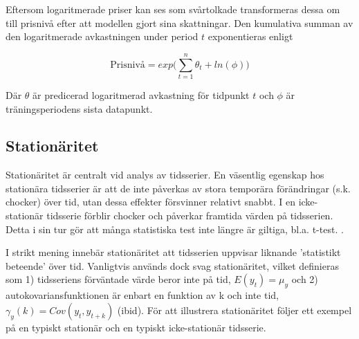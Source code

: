 \documentclass[11pt]{article}
\begin{document}
Eftersom logaritmerade priser kan ses som svårtolkade transformeras dessa om till prisnivå efter att modellen gjort sina skattningar. Den kumulativa summan av den logaritmerade avkastningen under period $t$ exponentieras enligt

\begin{equation}
    \text{Prisnivå} =  exp\Big({\sum\limits_{t=1}^n \theta_{t}} + ln(\phi)\Big)
\end{equation}

Där  $\theta$ är predicerad logaritmerad avkastning för tidpunkt $t$ och $\phi$ är träningsperiodens sista datapunkt. 







\subsection{Stationäritet}
Stationäritet är centralt vid analys av tidsserier. En väsentlig egenskap hos stationära tidsserier är att de inte påverkas av stora temporära förändringar (s.k. chocker) över tid, utan dessa effekter försvinner relativt snabbt. I en icke-stationär tidsserie förblir chocker och påverkar framtida värden på tidsserien. Detta i sin tur gör att många statistiska test inte längre är giltiga, bl.a. t-test. \parencite{montgomery2015forecasting}. \par

I strikt mening innebär stationäritet att tidsserien uppvisar liknande 'statistikt beteende' över tid. Vanligtvis används dock svag stationäritet, vilket definieras som 1) tidsseriens förväntade värde beror inte på tid, \(E(y_t)=\mu_y\) och 2) autokovariansfunktionen är enbart en funktion av k och inte tid, \(\gamma_y(k) = Cov(y_t, y_{t+k})\) (ibid). För att illustrera stationäritet följer ett exempel på en typiskt stationär och en typiskt icke-stationär tidsserie.
\end{document}
